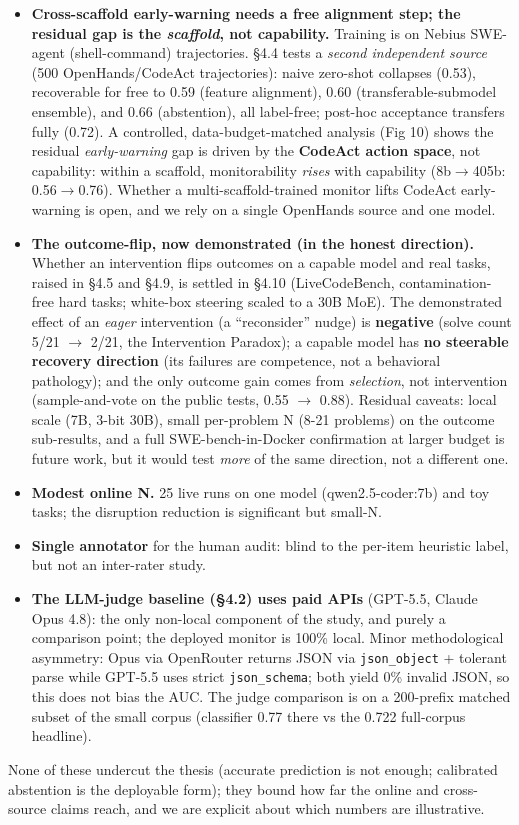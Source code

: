\begin{itemize}
\item \textbf{Cross-scaffold early-warning needs a free alignment step; the residual gap is the \emph{scaffold}, not capability.} Training is on Nebius SWE-agent (shell-command) trajectories. \S4.4 tests a \emph{second independent source} (500 OpenHands/CodeAct trajectories): naive zero-shot collapses (0.53), recoverable for free to 0.59 (feature alignment), 0.60 (transferable-submodel ensemble), and 0.66 (abstention), all label-free; post-hoc acceptance transfers fully (0.72). A controlled, data-budget-matched analysis (Fig 10) shows the residual \emph{early-warning} gap is driven by the \textbf{CodeAct action space}, not capability: within a scaffold, monitorability \emph{rises} with capability (8b$\to$405b: 0.56$\to$0.76). Whether a multi-scaffold-trained monitor lifts CodeAct early-warning is open, and we rely on a single OpenHands source and one model.
\item \textbf{The outcome-flip, now demonstrated (in the honest direction).} Whether an intervention flips outcomes on a capable model and real tasks, raised in \S4.5 and \S4.9, is settled in \S4.10 (LiveCodeBench, contamination-free hard tasks; white-box steering scaled to a 30B MoE). The demonstrated effect of an \emph{eager} intervention (a ``reconsider'' nudge) is \textbf{negative} (solve count 5/21 $\to$ 2/21, the Intervention Paradox); a capable model has \textbf{no steerable recovery direction} (its failures are competence, not a behavioral pathology); and the only outcome gain comes from \emph{selection}, not intervention (sample-and-vote on the public tests, 0.55 $\to$ 0.88). Residual caveats: local scale (7B, 3-bit 30B), small per-problem N (8-21 problems) on the outcome sub-results, and a full SWE-bench-in-Docker confirmation at larger budget is future work, but it would test \emph{more} of the same direction, not a different one.
\item \textbf{Modest online N.} 25 live runs on one model (qwen2.5-coder:7b) and toy tasks; the disruption reduction is significant but small-N.
\item \textbf{Single annotator} for the human audit: blind to the per-item heuristic label, but not an inter-rater study.
\item \textbf{The LLM-judge baseline (\S4.2) uses paid APIs} (GPT-5.5, Claude Opus 4.8): the only non-local component of the study, and purely a comparison point; the deployed monitor is 100\% local. Minor methodological asymmetry: Opus via OpenRouter returns JSON via \texttt{json\_object} + tolerant parse while GPT-5.5 uses strict \texttt{json\_schema}; both yield 0\% invalid JSON, so this does not bias the AUC. The judge comparison is on a 200-prefix matched subset of the small corpus (classifier 0.77 there vs the 0.722 full-corpus headline).
\end{itemize}
None of these undercut the thesis (accurate prediction is not enough; calibrated abstention is the deployable form); they bound how far the online and cross-source claims reach, and we are explicit about which numbers are illustrative.

